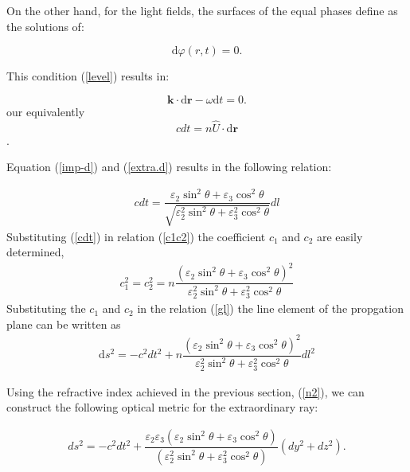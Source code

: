 \documentclass[9pt,twocolumn,twoside]{osajnl}
\begin{document}
On the other hand, for the light fields, the surfaces of the equal phases define as the solutions of:

\begin{equation}\label{level}
\mathrm{d}{\varphi(r,t)}=0.
\end{equation}

This condition (\ref{level}) results in: 

\begin{equation}\label{phase1}
\mathbf{k}\cdot {\mathrm{d}\mathbf{r}}-\omega\mathrm{d}{t}=0.
\end{equation}
our equivalently
\begin{equation}
c dt=n\hat{U}\cdot {\mathrm{d}\mathbf{r}}
\end{equation}.

Equation (\ref{imp-d}) and (\ref{extra.d}) results in the following relation:


\begin{eqnarray}\label{cdt}
c dt=\dfrac{\varepsilon_{2} \sin^{2}{\theta} + \varepsilon_{3}\cos^{2}{\theta}}{\sqrt{\varepsilon_{2}^{2} \sin^{2}{\theta} + \varepsilon_{3}^{2}\cos^{2}{\theta}}}dl
\end{eqnarray}
Substituting (\ref{cdt}) in relation (\ref{c1c2}) the coefficient $c_{1}$ and $c_{2}$ are easily determined,
\begin{eqnarray}
c_{1}^{2}=c_{2}^{2}=n\dfrac{\left(\varepsilon_{2} \sin^{2}{\theta} +\varepsilon_{3}\cos^{2}{\theta}\right)^{2}}{\varepsilon_{2}^{2} \sin^{2}{\theta} + \varepsilon_{3}^{2}\cos^{2}{\theta}}
\end{eqnarray}
Substituting the $c_{1}$ and $c_{2}$ in the relation (\ref{gl}) the line element of the propgation plane can be written as
\begin{eqnarray}\label{general-metric}
\mathrm{d}s^{2}=-c^{2}dt^{2}+ n\dfrac{\left(\varepsilon_{2} \sin^{2}{\theta} + \varepsilon_{3}\cos^{2}{\theta}\right)^{2}}{\varepsilon_{2}^{2} \sin^{2}{\theta} + \varepsilon_{3}^{2}\cos^{2}{\theta}}dl^{2}
\end{eqnarray}

Using the refractive index  achieved in the previous section, (\ref{n2}), we can construct the following optical metric for the extraordinary ray:

\begin{eqnarray}\label{el-metric}
ds^{2}=-c^{2}dt^{2} + \dfrac{\varepsilon_{2}\varepsilon_{3}\left({\varepsilon_{2} \sin^{2}{\theta} + \varepsilon_{3}\cos^{2}{\theta}}\right)}{\left({\varepsilon_{2}^{2} \sin^{2}{\theta} + \varepsilon_{3}^{2}\cos^{2}{\theta}}\right)} {(dy^{2}+dz^{2})}.
\end{eqnarray}
\end{document}
